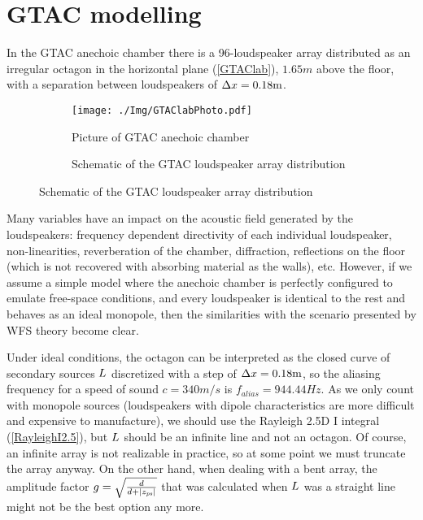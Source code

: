 \section{GTAC modelling}
In the GTAC anechoic chamber there is a 96-loudspeaker array distributed as an irregular octagon in the horizontal plane (\autoref{GTAClab}), $1.65 \si{m}$ above the floor, with a separation between loudspeakers of $\secondarySourceSeparation = 0.18 \si{m}$. 

\begin{figure}
	\centering
	\begin{subfigure}[c]{0.55\textwidth}
		\centering
		\texttt{[image: ./Img/GTAClabPhoto.pdf]}
		\caption{Picture of GTAC anechoic chamber \cite{Czy2011}}
		\label{GTAClabPhoto}
	\end{subfigure}
	\begin{subfigure}[c]{0.35\textwidth}
		\centering
		\caption[WFS array distribution]{Schematic of the GTAC loudspeaker array distribution}
		\label{WFSdistribution}
	\end{subfigure}
	\label{GTAClab}
\end{figure}

Many variables have an impact on the acoustic field generated by the loudspeakers: frequency dependent directivity of each individual loudspeaker, non-linearities, reverberation of the chamber, diffraction, reflections on the floor (which is not recovered with absorbing material as the walls), etc. However, if we assume a simple model where the anechoic chamber is perfectly configured to emulate free-space conditions, and every loudspeaker is identical to the rest and behaves as an ideal monopole, then the similarities with the scenario presented by WFS theory become clear.

Under ideal conditions, the octagon can be interpreted as the closed curve of secondary sources $\sectionTheo$ discretized with a step of $\secondarySourceSeparation = 0.18 \si{m}$, so the aliasing frequency for a speed of sound $c = 340 \si{m/s}$ is $f_\mathit{alias} = 944.44\si{Hz}$.  As we only count with monopole sources (loudspeakers with dipole characteristics are more difficult and expensive to manufacture), we should use the Rayleigh 2.5D I integral (\autoref{RayleighI2.5}), but $\sectionTheo$ should be an infinite line and not an octagon. Of course, an infinite array is not realizable in practice, so at some point we must truncate the array anyway. On the other hand, when dealing with a bent array, the amplitude factor $g = \sqrt{\frac{d}{d + \abs{\PosTheo[primarySource][z]}}}$ that was calculated when $\sectionTheo$ was a straight line might not be the best option any more.

